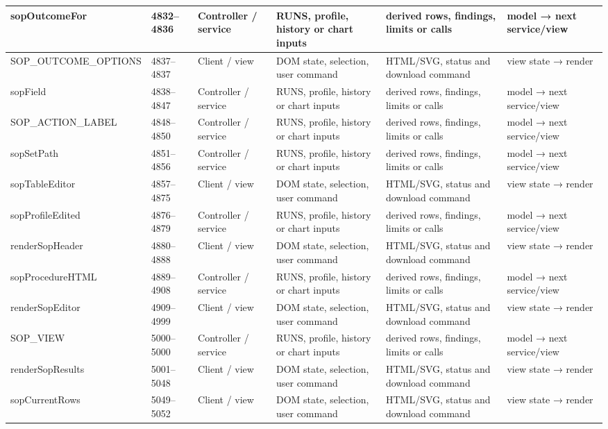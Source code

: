 \begin{landscape}
\begin{longtable}{@{}p{3.2cm}p{1.45cm}p{2.7cm}p{4.0cm}p{4.0cm}p{3.0cm}@{}}
sopOutcomeFor & 4832--4836 & Controller / service & RUNS, profile, history or chart inputs & derived rows, findings, limits or calls & model → next service/view \\\hline
SOP\_OUTCOME\_OPTIONS & 4837--4837 & Client / view & DOM state, selection, user command & HTML/SVG, status and download command & view state → render \\\hline
sopField & 4838--4847 & Controller / service & RUNS, profile, history or chart inputs & derived rows, findings, limits or calls & model → next service/view \\\hline
SOP\_ACTION\_LABEL & 4848--4850 & Controller / service & RUNS, profile, history or chart inputs & derived rows, findings, limits or calls & model → next service/view \\\hline
sopSetPath & 4851--4856 & Controller / service & RUNS, profile, history or chart inputs & derived rows, findings, limits or calls & model → next service/view \\\hline
sopTableEditor & 4857--4875 & Client / view & DOM state, selection, user command & HTML/SVG, status and download command & view state → render \\\hline
sopProfileEdited & 4876--4879 & Controller / service & RUNS, profile, history or chart inputs & derived rows, findings, limits or calls & model → next service/view \\\hline
renderSopHeader & 4880--4888 & Client / view & DOM state, selection, user command & HTML/SVG, status and download command & view state → render \\\hline
sopProcedureHTML & 4889--4908 & Controller / service & RUNS, profile, history or chart inputs & derived rows, findings, limits or calls & model → next service/view \\\hline
renderSopEditor & 4909--4999 & Client / view & DOM state, selection, user command & HTML/SVG, status and download command & view state → render \\\hline
SOP\_VIEW & 5000--5000 & Controller / service & RUNS, profile, history or chart inputs & derived rows, findings, limits or calls & model → next service/view \\\hline
renderSopResults & 5001--5048 & Client / view & DOM state, selection, user command & HTML/SVG, status and download command & view state → render \\\hline
sopCurrentRows & 5049--5052 & Client / view & DOM state, selection, user command & HTML/SVG, status and download command & view state → render \\\hline

\end{longtable}
\end{landscape}
